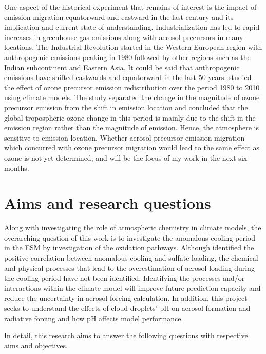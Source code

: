 One aspect of the historical experiment that remains of interest is the impact of emission migration equatorward and eastward in the last century and its implication and current state of understanding. Industrialization has led to rapid increases in greenhouse gas emissions along with aerosol precursors in many locations. The Industrial Revolution started in the Western European region with anthropogenic emissions peaking in 1980 followed by other regions such as the Indian subcontinent and Eastern Asia. It could be said that anthropogenic emissions have shifted eastwards and equatorward in the last 50 years.  \citet{zhangTroposphericOzoneChange2016} studied the effect of ozone precursor emission redistribution over the period 1980 to 2010 using climate models. The study separated the change in the magnitude of ozone precursor emission from the shift in emission location and concluded that the global tropospheric ozone change in this period is mainly due to the shift in the emission region rather than the magnitude of emission. Hence, the atmosphere is sensitive to emission location. Whether aerosol precursor emission migration which concurred with ozone precursor migration would lead to the same effect as ozone is not yet determined, and will be the focus of my work in the next six months.



\section{Aims and research questions}

Along with investigating the role of atmospheric chemistry in climate models, the overarching question of this work is to investigate the anomalous cooling period in the ESM by investigation of the  oxidation pathways. Although \citet{zhangRoleAnthropogenicAerosols2021} identified the positive correlation between anomalous cooling and sulfate loading, the chemical and physical processes that lead to the overestimation of aerosol loading during the cooling period have not been identified. Identifying the processes and/or interactions within the climate model will improve future prediction capacity and reduce the uncertainty in aerosol forcing calculation. In addition, this project seeks to understand the effects of cloud droplets' pH on aerosol formation and radiative forcing and how pH affects model performance. 

In detail, this research aims to answer the following questions with respective aims and objectives.


